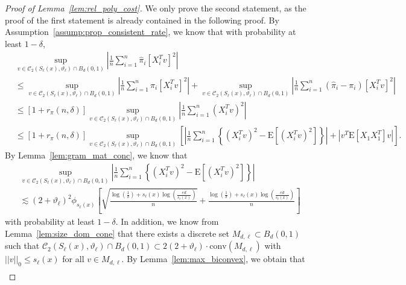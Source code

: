 \documentclass[ejsv2,noshowframe]{imsart}
\theoremstyle{plain}
\theoremstyle{definition}
\theoremstyle{remark}
\newcommand{\norm}[1]{\left|\left| #1 \right|\right|}
\renewcommand{\hat}{\widehat}
\begin{document}
\begin{proof}[Proof of Lemma~\ref{lem:rel_poly_cost}]
	We only prove the second statement, as the proof of the first statement is already contained in the following proof. By Assumption~\ref{assump:prop_consistent_rate}, we know that with probability at least $1-\delta$,
	\begin{align*}
		&\sup_{v\in \mathcal{C}_2\left(S_{\ell}(x), \vartheta_{\ell}\right)\cap B_d(0,1)} \left|\frac{1}{n} \sum_{i=1}^n \hat{\pi}_i\left[X_i^Tv\right]^2 \right| \\
		&\leq \sup_{v\in \mathcal{C}_2\left(S_{\ell}(x), \vartheta_{\ell}\right)\cap B_d(0,1)} \left|\frac{1}{n} \sum_{i=1}^n \pi_i\left[X_i^Tv\right]^2 \right| + \sup_{v\in \mathcal{C}_2\left(S_{\ell}(x), \vartheta_{\ell}\right)\cap B_d(0,1)} \left|\frac{1}{n} \sum_{i=1}^n \left(\hat{\pi}_i-\pi_i\right)\left[X_i^Tv\right]^2 \right| \\
		&\leq \left[1+r_{\pi}(n,\delta)\right] \sup_{v\in \mathcal{C}_2\left(S_{\ell}(x), \vartheta_{\ell}\right)\cap B_d(0,1)} \left|\frac{1}{n} \sum_{i=1}^n \left(X_i^Tv\right)^2 \right|\\
		&\leq \left[1+r_{\pi}(n,\delta)\right] \sup_{v\in \mathcal{C}_2\left(S_{\ell}(x), \vartheta_{\ell}\right)\cap B_d(0,1)}\left[\left|\frac{1}{n}\sum_{i=1}^n \left\{\left(X_i^Tv\right)^2 - \mathrm{E}\left[ \left(X_i^Tv\right)^2\right]\right\} \right| + \left|v^T \mathrm{E}\left[ X_1X_1^T\right] v\right| \right].
	\end{align*}
	By Lemma~\ref{lem:gram_mat_conc}, we know that 
	\begin{align*}
		&\sup_{v\in \mathcal{C}_2\left(S_{\ell}(x), \vartheta_{\ell}\right)\cap B_d(0,1)} \left|\frac{1}{n}\sum_{i=1}^n \left\{\left(X_i^Tv\right)^2 - \mathrm{E}\left[\left(X_i^Tv\right)^2\right]\right\} \right| \\
		&\lesssim (2+\vartheta_{\ell})^2 \phi_{s_{\ell}(x)}\left[\sqrt{\frac{\log(\frac{1}{\delta})+s_{\ell}(x)\log\left(\frac{ed}{s_{\ell}(x)}\right)}{n}} + \frac{\log(\frac{1}{\delta})+s_{\ell}(x)\log\left(\frac{ed}{s_{\ell}(x)}\right)}{n}\right]
	\end{align*}
	with probability at least $1-\delta$. In addition, we know from Lemma~\ref{lem:size_dom_cone} that there exists a discrete set $M_{d,\ell} \subset B_d(0,1)$ such that $\mathcal{C}_2\left(S_{\ell}(x),\vartheta_{\ell}\right) \cap B_d(0,1) \subset 2(2+\vartheta_{\ell}) \cdot \mathrm{conv}(M_{d,\ell})$ with $\norm{v}_0\leq s_{\ell}(x)$ for all $v\in M_{d,\ell}$. By Lemma~\ref{lem:max_biconvex}, we obtain that
	\begin{align*}

\end{align*}
\end{proof}
\end{document}
